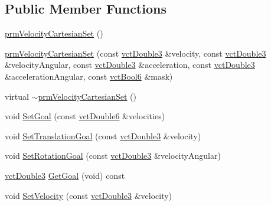 \subsection*{Public Member Functions}
\begin{DoxyCompactItemize}
\item 
\hyperlink{classprm_velocity_cartesian_set_ada468c087b329d4c9ba1b6eb431cf468}{prm\+Velocity\+Cartesian\+Set} ()
\item 
\hyperlink{classprm_velocity_cartesian_set_a52e3f562a76cdc54e5622b3e245949ea}{prm\+Velocity\+Cartesian\+Set} (const \hyperlink{vct_fixed_size_vector_types_8h_a4a89122c9d7f72c3f31fe8126e17c3af}{vct\+Double3} \&velocity, const \hyperlink{vct_fixed_size_vector_types_8h_a4a89122c9d7f72c3f31fe8126e17c3af}{vct\+Double3} \&velocity\+Angular, const \hyperlink{vct_fixed_size_vector_types_8h_a4a89122c9d7f72c3f31fe8126e17c3af}{vct\+Double3} \&acceleration, const \hyperlink{vct_fixed_size_vector_types_8h_a4a89122c9d7f72c3f31fe8126e17c3af}{vct\+Double3} \&acceleration\+Angular, const \hyperlink{vct_fixed_size_vector_types_8h_a1494a41869ce763813f2bf7f922b8fdd}{vct\+Bool6} \&mask)
\item 
virtual \hyperlink{classprm_velocity_cartesian_set_a036fd1bb9d1576378c48a23ae67f2db9}{$\sim$prm\+Velocity\+Cartesian\+Set} ()
\item 
void \hyperlink{classprm_velocity_cartesian_set_afd7e1b4306895c315a68c5ce7c8cba68}{Set\+Goal} (const \hyperlink{vct_fixed_size_vector_types_8h_a26a80e4d58f1201f2bfc347f4ac81bf8}{vct\+Double6} \&velocities)
\item 
void \hyperlink{classprm_velocity_cartesian_set_a144bfc61303b8f33a801fe9f22d2100b}{Set\+Translation\+Goal} (const \hyperlink{vct_fixed_size_vector_types_8h_a4a89122c9d7f72c3f31fe8126e17c3af}{vct\+Double3} \&velocity)
\item 
void \hyperlink{classprm_velocity_cartesian_set_aba3a6db1c99578c649ccbeb026aed140}{Set\+Rotation\+Goal} (const \hyperlink{vct_fixed_size_vector_types_8h_a4a89122c9d7f72c3f31fe8126e17c3af}{vct\+Double3} \&velocity\+Angular)
\item 
\hyperlink{vct_fixed_size_vector_types_8h_a4a89122c9d7f72c3f31fe8126e17c3af}{vct\+Double3} \hyperlink{classprm_velocity_cartesian_set_a9a00a6b4358e34abf38ebdb9360b8a2f}{Get\+Goal} (void) const 
\item 
void \hyperlink{classprm_velocity_cartesian_set_a7fbb5ad16bacd715db32b43ee6f29064}{Set\+Velocity} (const \hyperlink{vct_fixed_size_vector_types_8h_a4a89122c9d7f72c3f31fe8126e17c3af}{vct\+Double3} \&velocity)

\end{DoxyCompactItemize}
